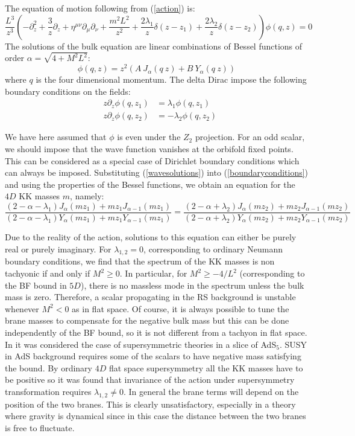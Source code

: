 \documentclass[a4paper,12pt,dvips]{article}
\begin{document}
The equation of motion following from (\ref{action}) is:
\begin{equation}
\frac {L^3} {z^3}(-\partial^2_z + \frac 3 z \partial_z + \eta^{\mu
\nu}\partial_\mu
\partial_\nu+ \frac {m^2L^2} {z^2}+ \frac {2\lambda_1} {z} \delta(z-z_1)+
\frac {2\lambda_2}
{z}
\delta(z-z_2))\phi(q,z)=0
\end{equation}
The solutions of the bulk equation are linear combinations of
Bessel functions of order $\alpha=\sqrt{4+M^2 L^2}$:
\begin{equation}
\phi(q,z)=z^2(A~J_\alpha(q~z)+B~Y_\alpha(q~z))
\label{wavesolutions}
\end{equation}
where $q$ is the four dimensional momentum. The delta Dirac impose
the following boundary conditions on the fields:
\begin{eqnarray}
&z\partial_z \phi(q,z_1)&=\lambda_1 \phi(q,z_1) \nonumber\\
&z\partial_z \phi(q,z_2)&=-\lambda_2 \phi(q,z_2)
\label{boundaryconditions}
\end{eqnarray}

We have here assumed that $\phi$ is even under the $Z_2$
projection. For an odd scalar, we should impose that the
wave function vanishes at the orbifold fixed points. This can be
considered as a special case of Dirichlet boundary conditions
which can always be imposed.
 Substituting (\ref{wavesolutions}) into
 (\ref{boundaryconditions})
 and using the properties of the Bessel functions, we obtain an
 equation for the $4D$ KK masses $m$, namely:
\begin{equation}
\frac {(2-\alpha-\lambda_1)J_\alpha(mz_1)+ mz_1 J_{\alpha -
1}(mz_1)} {(2-\alpha-\lambda_1)Y_\alpha(mz_1)+ mz_1 Y_{\alpha -
1}(mz_1)}=\frac {(2-\alpha+\lambda_2)J_\alpha(mz_2)+ mz_2
J_{\alpha - 1}(mz_2)} {(2-\alpha+\lambda_2)Y_\alpha(mz_2)+ mz_2
Y_{\alpha - 1}(mz_2)} \label{kkmasses}
\end{equation}

Due to the reality of the action, solutions to this equation can
either be purely real or purely imaginary. For $\lambda_{1,2}=0$,
corresponding to ordinary Neumann boundary conditions, we find
that the spectrum of the KK masses is non tachyonic if and only if
$M^2 \ge 0$. In particular, for $M^2\ge -4/L^2$ (corresponding to
the BF bound in $5D$), there is no massless mode in the spectrum
unless the bulk mass is zero. Therefore, a scalar propagating in
the RS background is unstable whenever $M^2<0$ as in flat space.
Of course, it is always possible to tune the brane masses to
compensate for the negative bulk mass but this can be done
independently of the BF bound, so it is not different from a
tachyon in flat space. In \cite{pomarol} it was considered the
case of supersymmetric theories in a slice of AdS$_5$. SUSY in AdS
background requires some of the scalars to have negative mass
satisfying the bound. By ordinary $4D$ flat space supersymmetry
all the KK masses have to be positive so it was found that
invariance of the action under supersymmetry transformation
requires $\lambda_{1,2} \ne 0$. In general the brane terms will
depend on the position of the two branes. This is clearly
unsatisfactory, especially in a theory where gravity is dynamical
since in this case the distance between the two branes is free to
fluctuate.
\end{document}
